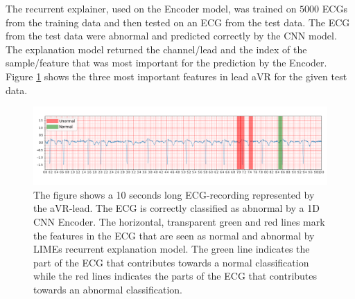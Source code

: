 
The recurrent explainer, used on the Encoder model, was trained on $5000$ ECGs from the training data and then tested on an ECG from the test data. The ECG from the test data were abnormal and predicted correctly by the CNN model. The explanation model returned the channel/lead and the index of the sample/feature that was most important for the prediction by the Encoder. Figure \ref{fig:expl_cnn} shows the three most important features in lead aVR for the given test data.

\begin{figure}[!htp]
    \centering
    \includegraphics[width=1\textwidth]{Figures/Abnormal-aVR.png}
    \caption{The figure shows a 10 seconds long ECG-recording represented by the aVR-lead. The ECG is correctly classified as abnormal by a 1D CNN Encoder. The horizontal, transparent green and red lines mark the features in the ECG that are seen as normal and abnormal by LIMEs recurrent explanation model. The green line indicates the part of the ECG that contributes towards a normal classification while the red lines indicates the parts of the ECG that contributes towards an abnormal classification.}
    \label{fig:expl_cnn}
\end{figure}

\newpage

